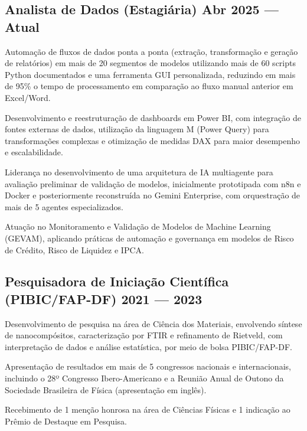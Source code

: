 \justifying

\subsection{{Analista de Dados (Estagiária)} \hfill Abr 2025 --- Atual}
\vspace{0.5em}
\begin{zitemize}
\setlength{\itemsep}{0.6em}

    \item Automação de fluxos de dados ponta a ponta (extração, transformação e geração de relatórios) em mais de 20 segmentos de modelos utilizando mais de 60 scripts Python documentados e uma ferramenta GUI personalizada, reduzindo em mais de 95\% o tempo de processamento em comparação ao fluxo manual anterior em Excel/Word.

    \item Desenvolvimento e reestruturação de dashboards em Power BI, com integração de fontes externas de dados, utilização da linguagem M (Power Query) para transformações complexas e otimização de medidas DAX para maior desempenho e escalabilidade.

    \item Liderança no desenvolvimento de uma arquitetura de IA multiagente para avaliação preliminar de validação de modelos, inicialmente prototipada com n8n e Docker e posteriormente reconstruída no Gemini Enterprise, com orquestração de mais de 5 agentes especializados.

    \item Atuação no Monitoramento e Validação de Modelos de Machine Learning (GEVAM), aplicando práticas de automação e governança em modelos de Risco de Crédito, Risco de Liquidez e IPCA.

    \vspace{1em}
\end{zitemize}


\subsection{Pesquisadora de Iniciação Científica (PIBIC/FAP-DF) \hfill 2021 --- 2023}
\begin{zitemize}
    \setlength{\itemsep}{0.6em}
    \item Desenvolvimento de pesquisa na área de Ciência dos Materiais, envolvendo síntese de nanocompósitos, caracterização por FTIR e refinamento de Rietveld, com interpretação de dados e análise estatística, por meio de bolsa PIBIC/FAP-DF.
    \item Apresentação de resultados em mais de 5 congressos nacionais e internacionais, incluindo o 28º Congresso Ibero-Americano e a Reunião Anual de Outono da Sociedade Brasileira de Física (apresentação em inglês).
    \item Recebimento de 1 menção honrosa na área de Ciências Físicas e 1 indicação ao Prêmio de Destaque em Pesquisa.
\end{zitemize}